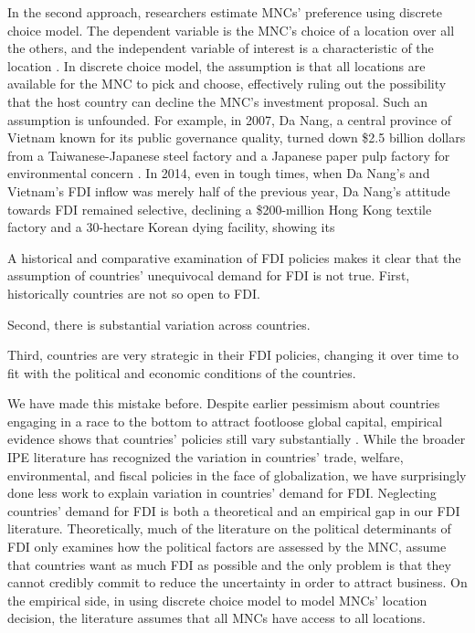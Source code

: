 In the second approach, researchers estimate MNCs' preference using discrete
choice model. The dependent variable is the MNC's choice of a location over all
the others, and the independent variable of interest is a characteristic of the
location \citep{Arauzo-Carod2010}. In discrete choice model, the assumption is
that all locations are available for the MNC to pick and choose, effectively
ruling out the possibility that the host country can decline the MNC's
investment proposal. Such an assumption is unfounded. For example, in 2007, Da Nang, a
central province of Vietnam known for its public governance quality, turned down
\$2.5 billion dollars from
a Taiwanese-Japanese steel factory and a Japanese paper pulp factory for
environmental concern \citep{NLD}. In 2014, even in tough times, when Da Nang's and Vietnam's
FDI inflow was
merely half of the previous year, Da Nang's attitude towards FDI remained
selective, declining a \$200-million Hong Kong textile factory and a 30-hectare Korean dying
facility, showing its  

A historical and comparative examination of FDI policies makes it clear that the
assumption of countries' unequivocal demand for FDI is not true. First,
historically countries are not so open to FDI.

Second, there is substantial variation across countries.

Third, countries are very strategic in their FDI policies, changing it over
time to fit with the political and economic conditions of the countries.


We have made this mistake before. Despite earlier pessimism about countries engaging in a race to the bottom to
attract footloose global capital, empirical evidence shows that countries'
policies still vary substantially \citep{Drezner2001}. While the broader IPE
literature has recognized the variation in countries' trade, welfare,
environmental, and fiscal policies in the face of globalization, we have
surprisingly done less work to explain variation in countries' demand for FDI.
Neglecting countries' demand for FDI is both a theoretical and an empirical gap
in our FDI literature. Theoretically, much of the literature on the political
determinants of FDI only examines how the political factors are assessed by the MNC, assume that countries want as much FDI as possible and the
only problem is that they cannot credibly commit to reduce the uncertainty in
order to attract business. On the empirical side, in using discrete choice model
to model MNCs' location decision, the literature assumes that all MNCs have
access to all locations.

